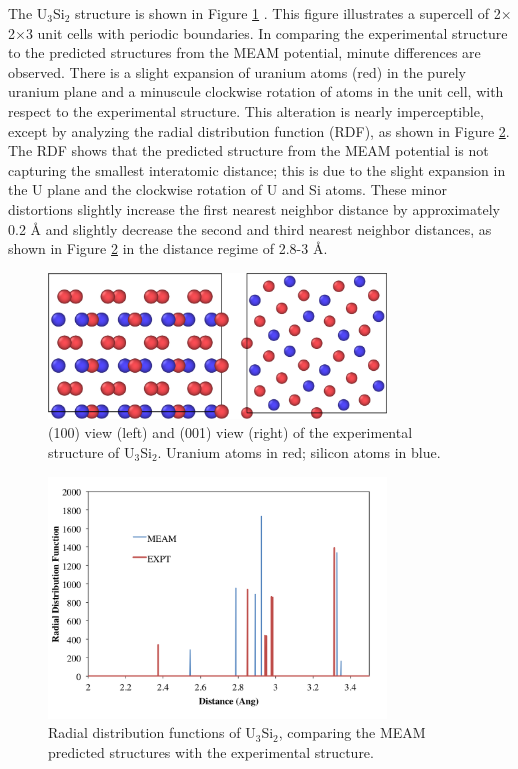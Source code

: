\documentclass[review]{elsarticle}
\begin{document}
The U$_{3}$Si$_{2}$ structure is shown in Figure \ref{fig:ben1} \cite{zachariasen1949}.  This figure illustrates a supercell of 2$\times$2$\times$3 unit cells with periodic boundaries.  In comparing the experimental structure to the predicted structures from the MEAM potential, minute differences are observed.  There is a slight expansion of uranium atoms (red) in the purely uranium plane and a minuscule clockwise rotation of atoms in the unit cell, with respect to the experimental structure.  This alteration is nearly imperceptible, except by analyzing the radial distribution function (RDF), as shown in Figure \ref{fig:benrdf}.  The RDF shows that the predicted structure from the MEAM potential is not capturing the smallest interatomic distance; this is due to the slight expansion in the U plane and the clockwise rotation of U and Si atoms.  These minor distortions slightly increase the first nearest neighbor distance by approximately 0.2 {\AA} and slightly decrease the second and third nearest neighbor distances, as shown in Figure \ref{fig:benrdf} in the distance regime of 2.8-3 {\AA}.  

\begin{figure}[ht]
	\centering
	\includegraphics[width=0.8\textwidth]{ben1NEW.png}
    \caption{(100) view (left) and (001) view (right) of the experimental structure of U$_{3}$Si$_{2}$.  Uranium atoms in red; silicon atoms in blue.}\label{fig:ben1}
\end{figure}  

\begin{figure}[ht]
	\centering
	\includegraphics[width=0.8\textwidth]{rdfKK1.png}
    \caption{Radial distribution functions of U$_{3}$Si$_{2}$, comparing the MEAM predicted structures with the experimental structure.}\label{fig:benrdf}
\end{figure}
\end{document}
